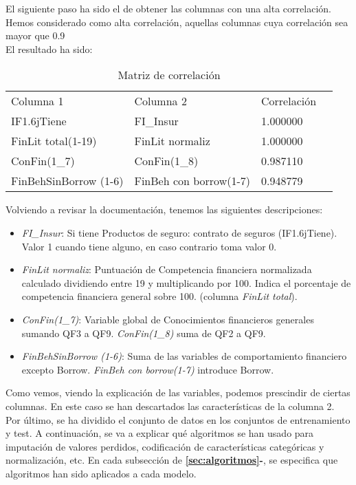 El siguiente paso ha sido el de obtener las columnas con una alta correlación. Hemos considerado como alta correlación, aquellas columnas cuya correlación sea mayor que 0.9\\
El resultado ha sido: \\
\begin{table}[H]
	\centering
	\begin{tabular}{|l|l|l|l|}
		\cline{1-3}
		Columna 1             & Columna 2              & Correlación \\ \cline{1-3}
		IF1.6jTiene           & FI\_Insur              & 1.000000    \\ \cline{1-3}
		FinLit total(1-19)    & FinLit normaliz        & 1.000000    \\ \cline{1-3}
		ConFin(1\_7)          & ConFin(1\_8)           & 0.987110    \\ \cline{1-3}
		FinBehSinBorrow (1-6) & FinBeh con borrow(1-7) & 0.948779    \\ \cline{1-3}
	\end{tabular}
	\label{tab:correlacion}
	\caption{Matriz de correlación}
\end{table}
Volviendo a revisar la documentación, tenemos las siguientes descripciones:
\linebreak
\begin{itemize}
	\item \textit{FI\_Insur}: Si tiene Productos de seguro: contrato de seguros (IF1.6jTiene). Valor 1 cuando tiene alguno, en caso contrario toma valor 0.
	\item \textit{FinLit normaliz}: Puntuación de Competencia financiera normalizada calculado dividiendo entre 19 y multiplicando por 100. Indica el porcentaje de competencia financiera general sobre 100. (columna \textit{FinLit total}).
	\item \textit{ConFin(1\_7)}: Variable global de Conocimientos financieros generales sumando QF3 a QF9. \textit{ConFin(1\_8)} suma de QF2 a QF9.
	\item \textit{FinBehSinBorrow (1-6)}: Suma de las variables de comportamiento financiero excepto Borrow. \textit{FinBeh con borrow(1-7) } introduce Borrow.
\end{itemize}
Como vemos, viendo la explicación de las variables, podemos prescindir de ciertas columnas. En este caso se han descartados las características de la columna 2.\\
\linebreak
Por último, se ha dividido el conjunto de datos en los conjuntos de entrenamiento y test.
\linebreak
A continuación, se va a explicar qué algoritmos se han usado para imputación de valores perdidos, codificación de características categóricas y normalización, etc. En cada subsección de \textbf{\ref{sec:algoritmos}-}, se especifica que algoritmos han sido aplicados a cada modelo.

